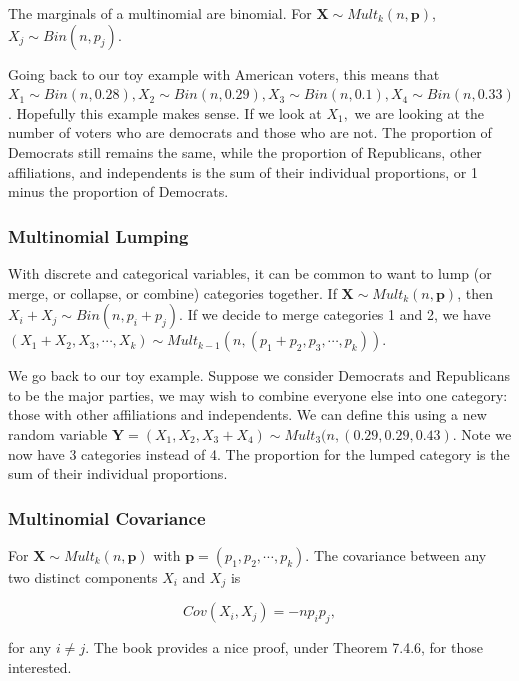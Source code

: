 \documentclass[
]{book}
\begin{document}
The marginals of a multinomial are binomial. For \(\boldsymbol{X} \sim Mult_k(n, \boldsymbol{p})\), \(X_j \sim Bin(n, p_j)\).

Going back to our toy example with American voters, this means that \(X_1 \sim Bin(n,0.28), X_2 \sim Bin(n,0.29), X_3 \sim Bin(n, 0.1), X_4 \sim Bin(n,0.33)\). Hopefully this example makes sense. If we look at \(X_1,\) we are looking at the number of voters who are democrats and those who are not. The proportion of Democrats still remains the same, while the proportion of Republicans, other affiliations, and independents is the sum of their individual proportions, or 1 minus the proportion of Democrats.

\subsubsection{Multinomial Lumping}\label{multinomial-lumping}

With discrete and categorical variables, it can be common to want to lump (or merge, or collapse, or combine) categories together. If \(\boldsymbol{X} \sim Mult_k(n, \boldsymbol{p})\), then \(X_i + X_j \sim Bin(n, p_i + p_j)\). If we decide to merge categories 1 and 2, we have \((X_1 + X_2, X_3, \cdots, X_k) \sim Mult_{k-1}(n, (p_1 + p_2, p_3, \cdots, p_k))\).

We go back to our toy example. Suppose we consider Democrats and Republicans to be the major parties, we may wish to combine everyone else into one category: those with other affiliations and independents. We can define this using a new random variable \(\boldsymbol{Y} = (X_1, X_2, X_3+X_4) \sim Mult_3(n,(0.29,0.29,0.43)\). Note we now have 3 categories instead of 4. The proportion for the lumped category is the sum of their individual proportions.

\subsubsection{Multinomial Covariance}\label{multinomial-covariance}

For \(\boldsymbol{X} \sim Mult_k(n, \boldsymbol{p})\) with \(\boldsymbol{p} = (p_1,p_2, \cdots, p_k)\). The covariance between any two distinct components \(X_i\) and \(X_j\) is

\begin{equation} 
Cov(X_i, X_j) = -n p_i p_j,
\label{eq:5-multinomialcov}
\end{equation}

for any \(i \neq j\). The book provides a nice proof, under Theorem 7.4.6, for those interested.
\end{document}
